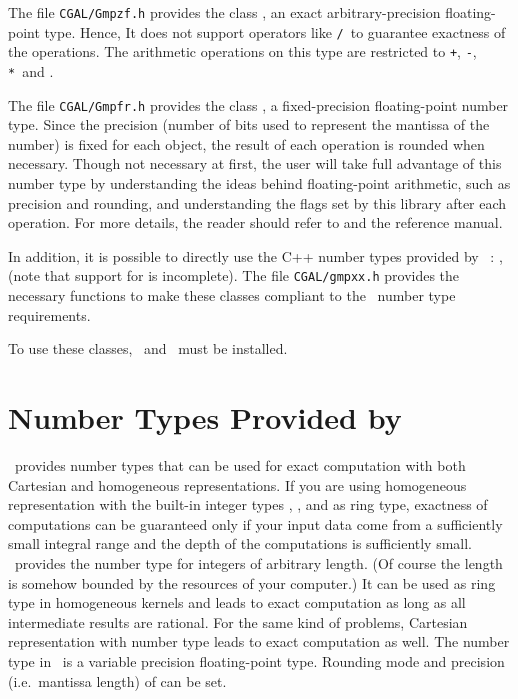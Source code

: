 The file {\tt CGAL/Gmpzf.h} provides the class , an exact
arbitrary-precision floating-point type. Hence, It does not support
operators like \verb=/=\ to guarantee exactness of the operations. The
arithmetic operations on this type are restricted to \verb=+=, \verb=-=,
\verb=*=\ and .

The file {\tt CGAL/Gmpfr.h} provides the class ,
a fixed-precision floating-point number type. Since the precision
(number of bits used to represent the mantissa of the number) is fixed
for each object, the result of each operation is rounded when necessary.
Though not necessary at first, the user will take full advantage of this
number type by understanding the ideas behind floating-point arithmetic,
such as precision and rounding, and understanding the flags set by this
library after each operation.  For more details, the reader should refer
to \cite{cgal:mt-mpfr} and the  reference manual.

In addition, it is possible to directly use the C++ number types provided by
\gmp~: ,  (note that support for
 is incomplete).  The file {\tt CGAL/gmpxx.h} provides the
necessary functions to make these classes compliant to the \cgal\ number type
requirements.

To use these classes, \gmp\ and \mpfr\ must be installed.


\section[Number Types Provided by LEDA] {Number Types Provided by \leda}
\label{leda-nt}

\leda\ provides number types that can be used for exact computation 
with both Cartesian and homogeneous representations.  If you are using
homogeneous representation with the built-in integer types
, , and  as ring type, exactness of
computations can be guaranteed only if your input data come from a
sufficiently small integral range and the depth of the computations is
sufficiently small.  \leda\ provides the number type  for
integers of arbitrary length. (Of course the length is
somehow bounded by the resources of your computer.)  It can be used as
ring type in homogeneous kernels and leads to exact
computation as long as all intermediate results are rational.  For the
same kind of problems, Cartesian representation with number type
 leads to exact computation as well.
The number type  in \leda\ is a variable precision
floating-point type. Rounding mode and precision (i.e.\ mantissa length) of
 can be set. 

